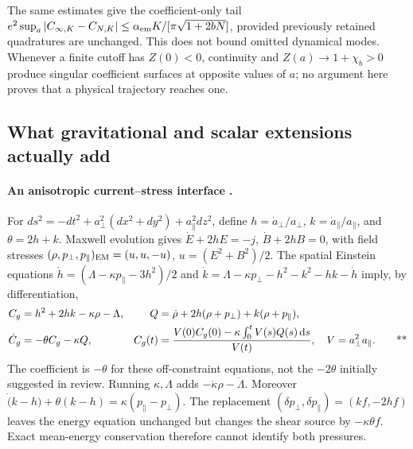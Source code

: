 The same estimates give the coefficient-only tail
\(e^2\sup_a|C_{\infty,K}-C_{N,K}|\le
\alpha_{\rm em}K/[\pi\sqrt{1+2bN}]\), provided previously retained
quadratures are unchanged.  This does not bound omitted dynamical modes.
Whenever a finite cutoff has \(Z(0)<0\), continuity and
\(Z(a)\to1+\chi_b>0\) produce singular coefficient surfaces at opposite
values of \(a\); no argument here proves that a physical trajectory reaches
one.

\subsection{What gravitational and scalar extensions actually add}
\label{early:gravity}

\paragraph{An anisotropic current--stress interface \workstar.}
For \(ds^2=-dt^2+a_\perp^2(dx^2+dy^2)+a_\parallel^2dz^2\), define
\(h=\dot a_\perp/a_\perp\), \(k=\dot a_\parallel/a_\parallel\), and
\(\theta=2h+k\).  Maxwell evolution gives
\(\dot E+2hE=-j\), \(\dot B+2hB=0\), with field stresses
\((\rho,p_\perp,p_\parallel)_{\rm EM}=(u,u,-u)\),
\(u=(E^2+B^2)/2\).  The spatial Einstein equations
\(\dot h=(\Lambda-\kappa p_\parallel-3h^2)/2\) and
\(\dot k=\Lambda-\kappa p_\perp-h^2-k^2-hk-\dot h\) imply, by differentiation,
\begin{align}
 C_g&=h^2+2hk-\kappa\rho-\Lambda,&
 Q&=\dot\rho+2h(\rho+p_\perp)+k(\rho+p_\parallel),\notag\\
 \dot C_g&=-\theta C_g-\kappa Q,&
 C_g(t)&=\frac{V(0)C_g(0)-\kappa\int_0^tV(s)Q(s)\,\mathrm{d} s}{V(t)},
 \quad V=a_\perp^2a_\parallel.
 \qquad\text{**}\label{early:constraint}
\end{align}
The coefficient is \(-\theta\) for these off-constraint equations, not the
\(-2\theta\) initially suggested in review.  Running \(\kappa,\Lambda\)
adds \(-\dot\kappa\rho-\dot\Lambda\).  Moreover
\(\dot(k-h)+\theta(k-h)=\kappa(p_\parallel-p_\perp)\).
The replacement \((\delta p_\perp,\delta p_\parallel)=(kf,-2hf)\) leaves
the energy equation unchanged but changes the shear source by
\(-\kappa\theta f\).  Exact mean-energy conservation therefore cannot identify
both pressures.

